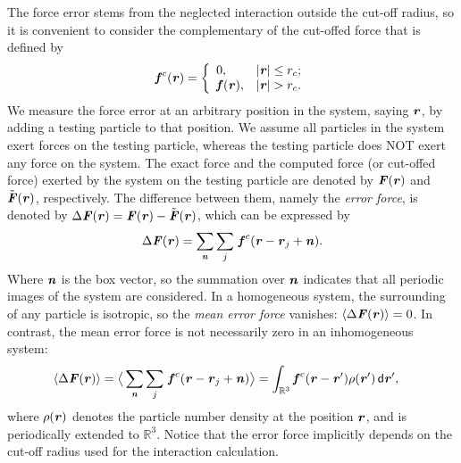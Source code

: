 \documentclass[aps, pre, preprint]{revtex4}
\renewcommand{\v}[1]{\textbf{\textit{#1}}}
\renewcommand{\d}[1]{\textsf{#1}}
\begin{document}
The force error stems from the neglected interaction outside
the cut-off radius, so it is convenient to consider the complementary
of the cut-offed force that is defined by
\begin{align}
  \v f^c(\v r) =
  \left\{
  \begin{array}{ll}
    0, & \vert\v r\vert\leq r_c; \\
    \v f(\v r), & \vert\v r\vert > r_c.
  \end{array}
  \right.
\end{align}
We measure the force error at an arbitrary position in the system,
saying $\v r$, by adding a testing particle to that position.  We
assume all particles in the system exert forces on the testing
particle, whereas the testing particle does NOT exert any force on the
system.  The exact force and the computed force (or cut-offed force)
exerted by the system on the testing particle are denoted by ${\v
  F}(\v r)$ and $\tilde{\v F}(\v r)$, respectively.  The difference
between them, namely the \emph{error force}, is denoted by $\Delta\v
F(\v r) = \v F(\v r) - \tilde{\v F}(\v r)$, which can be expressed by
\begin{align}
  \Delta\v F(\v r) = \sum_{\v n}\sum_{j}\, \v f^c(\v r - \v r_j + \v n).
\end{align}
Where $\v n$ is the box vector, so the summation over $\v n$ indicates
that all periodic images of the system are considered. In a
homogeneous system, the surrounding of any particle is isotropic, so
the \emph{mean error force} vanishes: $\langle\Delta\v F(\v r)\rangle
= 0$. In contrast, the mean error force is not necessarily zero in an
inhomogeneous system:
\begin{align} \label{eqn:tmp3} %
  \langle\Delta\v F(\v r)\rangle
  &=
  \big\langle
  \sum_{\v n}\sum_{j}\, \v f^c(\v r - \v r_j + \v n)
  \big\rangle 
  =
  \int_{\mathbb R^3}\v f^c(\v r - \v r')\rho(\v r')\,\d d\v r',
\end{align}
where $\rho(\v r)$ denotes the particle number density at the position
$\v r$, and is periodically extended to $\mathbb R^3$. Notice that the
error force implicitly depends on the cut-off radius used for the
interaction calculation.
\end{document}
